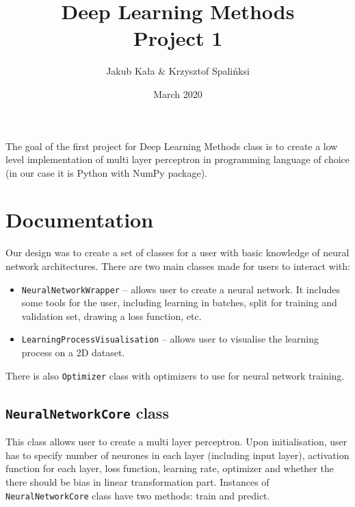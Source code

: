 \documentclass[a4]{article}
\title{Deep Learning Methods \\ Project 1}
\author{Jakub Kała \& Krzysztof Spalińksi}
\date{March 2020}
\begin{document}
\maketitle


The goal of the first project for Deep Learning Methods class is to create a low level implementation of multi layer perceptron in programming language of choice (in our case it is Python with NumPy package).

\tableofcontents
\vspace{2em}


 

\newpage
\section{Documentation}

Our design was to create a set of classes for a user with basic knowledge of neural network architectures. There are two main classes made for users to interact with: 
\begin{itemize}
\itemsep0em 
	\item \texttt{NeuralNetworkWrapper} -- allows user to create a neural network. It includes some tools for the user, including learning in batches, split for training and validation set, drawing a loss function, etc.
	\item \texttt{LearningProcessVisualisation} -- allows user to visualise the learning process on a 2D dataset.
\end{itemize}
There is also \texttt{Optimizer} class with optimizers to use for neural network training.  

\subsection{\texttt{NeuralNetworkCore} class}
This class allows user to create a multi layer perceptron. Upon initialisation, user has to specify number of neurones in each layer (including input layer), activation function for each layer, loss function, learning rate, optimizer and whether the there should be bias in linear transformation part. Instances of \texttt{NeuralNetworkCore} class have two methods: train and predict. 
\end{document}
